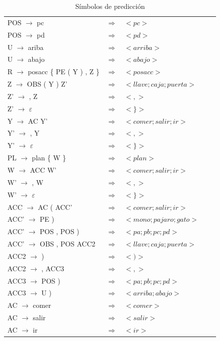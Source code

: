 \documentclass[11pt,a4paper,spanish,twoside]{book}
\theoremstyle{plain} \newtheorem{nota}{Nota}
\begin{document}
\begin{table}[!ht]
\begin{tabular}{lllll}
    POS $\to$ pc & $\Longrightarrow$ & $<pc>$ \\
    POS $\to$ pd & $\Longrightarrow$ & $<pd>$ \\
    U $\to$ ariba & $\Longrightarrow$ & $<arriba>$ \\
    U $\to$ abajo & $\Longrightarrow$ & $<abajo>$ \\
    R $\to$ posacc \{ PE ( Y ) , Z \} & $\Longrightarrow$ & $<posacc>$ \\
    Z $\to$ OBS ( Y ) Z' & $\Longrightarrow$ & $<llave;caja;puerta>$ \\
    Z' $\to$ , Z & $\Longrightarrow$ & $<,>$ \\
    Z' $\to$ $\varepsilon$ & $\Longrightarrow$ & $<\}>$ \\
    Y $\to$ AC Y' & $\Longrightarrow$ & $<comer;salir;ir>$ \\
    Y' $\to$ , Y & $\Longrightarrow$ & $<,>$ \\
    Y' $\to$ $\varepsilon$ & $\Longrightarrow$ & $<\}>$ \\
    PL $\to$ plan \{ W \} & $\Longrightarrow$ & $<plan>$ \\
    W $\to$ ACC W' & $\Longrightarrow$ & $<comer;salir;ir>$ \\
    W' $\to$ , W & $\Longrightarrow$ & $<,>$ \\
    W' $\to$ $\varepsilon$ & $\Longrightarrow$ & $<\}>$ \\
    ACC $\to$ AC ( ACC' & $\Longrightarrow$ & $<comer;salir;ir>$ \\
    ACC' $\to$ PE ) & $\Longrightarrow$ & $<mono;pajaro;gato>$ \\
    ACC' $\to$ POS , POS ) & $\Longrightarrow$ & $<pa;pb;pc;pd>$ \\
    ACC' $\to$ OBS , POS ACC2 & $\Longrightarrow$ & $<llave;caja;puerta>$ \\
    ACC2 $\to$ ) & $\Longrightarrow$ & $<)>$ \\
    ACC2 $\to$ , ACC3 & $\Longrightarrow$ & $<,>$ \\
    ACC3 $\to$ POS ) & $\Longrightarrow$ & $<pa;pb;pc;pd>$ \\
    ACC3 $\to$ U ) & $\Longrightarrow$ & $<arriba;abajo>$ \\
    AC $\to$ comer & $\Longrightarrow$ & $<comer>$ \\
    AC $\to$ salir & $\Longrightarrow$ & $<salir>$ \\
    AC $\to$ ir & $\Longrightarrow$ & $<ir>$ \\
    \hline
  \end{tabular}
  \caption{Símbolos de predicción}\label{Pre}
\end{table}
\end{document}

